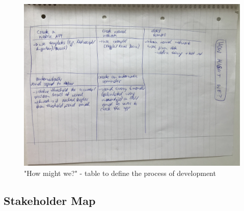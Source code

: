\begin{figure}[h!]
	\centering
	\includegraphics[width=1\textwidth]{images/howmightwe.jpg}
	\caption{"How might we?" - table to define the process of development}
	\label{verticallatter}
\end{figure}

\subsection{Stakeholder Map}


